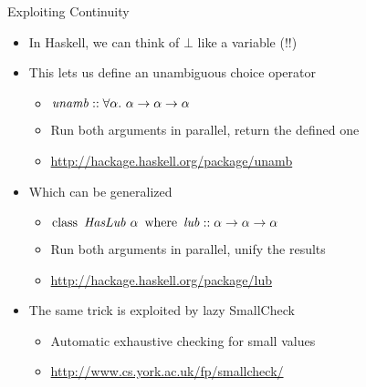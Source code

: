 \documentclass[pdf,fyma2]{prosper} %
\newcommand{\opr}[1]{\ensuremath{\operatorname{#1}}}
\newcommand{\var}[1]{\ensuremath{\text{\textrm{\textit{#1}}}}}
\begin{document}
\begin{slide}{Exploiting Continuity}
	\vspace{1em}
	\begin{itemize}
	\item In Haskell, we can think of $\bot$ like a variable (!!)
	\vspace{1em}
	\item This lets us define an unambiguous choice operator
    	\begin{itemize}
    	\item $\var{unamb} :: \forall\alpha.~ \alpha \to \alpha \to \alpha$
    	\item Run both arguments in parallel, return the defined one
        \item \url{http://hackage.haskell.org/package/unamb}
    	\end{itemize}
    \item Which can be generalized
    	\begin{itemize}
    	\item $\opr{class}~ \var{HasLub}~\alpha ~\opr{where}~ \var{lub} :: \alpha \to \alpha \to \alpha$
    	\item Run both arguments in parallel, unify the results
        \item \url{http://hackage.haskell.org/package/lub}
    	\end{itemize}
	\vspace{1em}
	\item The same trick is exploited by lazy SmallCheck
    	\begin{itemize}
    	\item Automatic exhaustive checking for small values
    	\item \url{http://www.cs.york.ac.uk/fp/smallcheck/}
    	\end{itemize}
	\end{itemize}
\end{slide}
\end{document}
